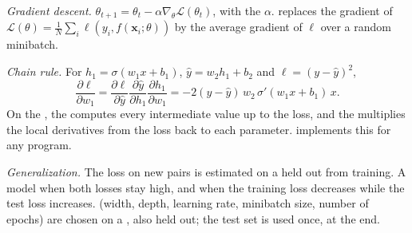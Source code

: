 \documentclass[11pt, a4paper]{exam}
\begin{document}
\begin{recap}
    \emph{Gradient descent.} $\theta_{t+1} = \theta_t - \alpha \nabla_\theta \mathcal{L}(\theta_t)$, with the  $\alpha$.  replaces the gradient of $\mathcal{L}(\theta) = \frac{1}{N} \sum_{i} \ell(y_i, f(\mathbf{x}_i; \theta))$ by the average gradient of $\ell$ over a random minibatch.

    \emph{Chain rule.} For $h_1 = \sigma(w_1 x + b_1)$, $\hat{y} = w_2 h_1 + b_2$ and $\ell = (y - \hat{y})^2$,
    \[
        \frac{\partial \ell}{\partial w_1} = \frac{\partial \ell}{\partial \hat{y}} \frac{\partial \hat{y}}{\partial h_1} \frac{\partial h_1}{\partial w_1} = -2(y - \hat{y}) \, w_2 \, \sigma'(w_1 x + b_1) \, x.
    \]
    On the , the  computes every intermediate value up to the loss, and the  multiplies the local derivatives from the loss back to each parameter.  implements this for any program.

    \emph{Generalization.} The loss on new pairs is estimated on a  held out from training. A model  when both losses stay high, and  when the training loss decreases while the test loss increases.  (width, depth, learning rate, minibatch size, number of epochs) are chosen on a , also held out; the test set is used once, at the end.
\end{recap}
\end{document}
